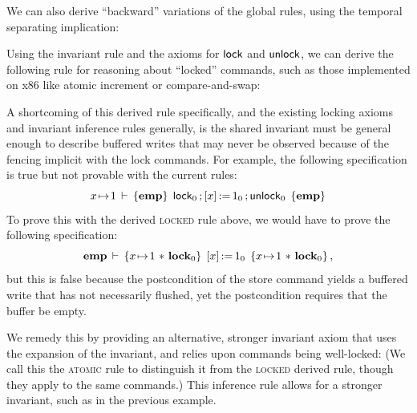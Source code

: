 \documentclass[11pt]{report}
\begin{document}
We can also derive ``backward'' variations of the global rules, using the temporal separating implication: 


Using the invariant rule and the axioms for $\operatorname{\mathsf{lock}}$ and $\operatorname{\mathsf{unlock}}$, we can derive the following rule for reasoning about ``locked'' commands, such as those implemented on x86 like atomic increment or compare-and-swap:  

A shortcoming of this derived rule specifically, and the existing locking axioms and invariant inference rules generally, is the shared invariant must be general enough to describe buffered writes that may never be observed because of the fencing implicit with the lock commands. For example, the following specification is true but not provable with the current rules:     \[ x \!\mapsto\! 1\,\vdash\,\left\lbrace \mathbf{emp} \right\rbrace\;\operatorname{\mathsf{lock}}_0 \operatorname{;} \left[ x \right] \operatorname{:\!=} 1_0 \operatorname{;} \operatorname{\mathsf{unlock}}_0\;\left\lbrace \mathbf{emp} \right\rbrace \] To prove this with the derived \textsc{locked} rule above, we would have to prove the following specification: \[ \mathbf{emp}\,\vdash\,\left\lbrace x \!\mapsto\! 1 \operatorname{\,\ast\,} \mathbf{lock}_{0} \right\rbrace\;\left[ x \right] \operatorname{:\!=} 1_0\;\left\lbrace x \!\mapsto\! 1 \operatorname{\,\ast\,} \mathbf{lock}_{0} \right\rbrace,\] but this is false because the postcondition of the store command yields a buffered write that has not necessarily flushed, yet the postcondition requires that the buffer be empty. 

We remedy this by providing an alternative, stronger invariant axiom that uses the expansion of the invariant, and relies upon commands being well-locked:  (We call this the \textsc{atomic} rule to distinguish it from the \textsc{locked} derived rule, though they apply to the same commands.) This inference rule allows for a stronger invariant, such as in the previous example.
 
\end{document}
